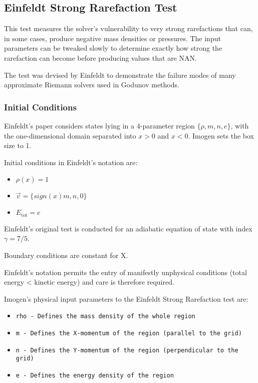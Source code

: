 
\subsection{Einfeldt Strong Rarefaction Test}

This test measures the solver's vulnerability to very strong rarefactions that can, in some cases, 
produce negative mass densities or pressures. The input parameters can be tweaked slowly to determine 
exactly how strong the rarefaction can become before producing values that are NAN. 

The test was devised by Einfeldt to demonstrate the failure modes of many approximate Riemann solvers
used in Godunov methods.

\subsubsection{Initial Conditions}

Einfeldt's paper considers states lying in a 4-parameter region $\{ \rho, m, n, e \}$, with the
one-dimensional domain separated into $x > 0$ and $x < 0$. Imogen sets the box size to 1.

Initial conditions in Einfeldt's notation are:
\begin{itemize}
\item $\rho(x) = 1$
\item $\vec{v} = \{ sign(x) m, n, 0 \}$
\item $E_{\text{tot}} = e$
\end{itemize}
Einfeldt's original test is conducted for an adiabatic equation of state with index $\gamma = 7/5$.

Boundary conditions are constant for X.

Einfeldt's notation permits the entry of manifestly unphysical conditions (total energy < kinetic energy)
and care is therefore required.

Imogen's physical input parameters to the Einfeldt Strong Rarefaction test are:
\begin{itemize}
\item \tt{rho} - Defines the mass density of the whole region
\item \tt{m} - Defines the X-momentum of the region (parallel to the grid)
\item \tt{n} - Defines the Y-momentum of the region (perpendicular to the grid)
\item \tt{e} - Defines the energy density of the region
\end{itemize}

